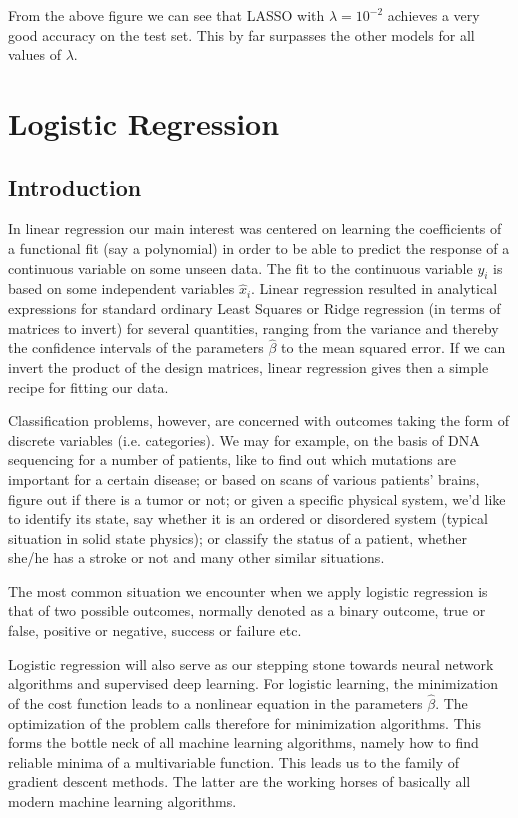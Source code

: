 \documentclass[letterpaper,10pt,english]{sphinxmanual}
\begin{document}
From the above figure we can see that LASSO with \(\lambda = 10^{-2}\)
achieves a very good accuracy on the test set. This by far surpasses the
other models for all values of \(\lambda\).


\section{Logistic Regression}
\label{\detokenize{chapter5:logistic-regression}}\label{\detokenize{chapter5::doc}}

\subsection{Introduction}
\label{\detokenize{chapter5:introduction}}
In linear regression our main interest was centered on learning the
coefficients of a functional fit (say a polynomial) in order to be
able to predict the response of a continuous variable on some unseen
data. The fit to the continuous variable \(y_i\) is based on some
independent variables \(\hat{x}_i\). Linear regression resulted in
analytical expressions for standard ordinary Least Squares or Ridge
regression (in terms of matrices to invert) for several quantities,
ranging from the variance and thereby the confidence intervals of the
parameters \(\hat{\beta}\) to the mean squared error. If we can invert
the product of the design matrices, linear regression gives then a
simple recipe for fitting our data.

Classification problems, however, are concerned with outcomes taking
the form of discrete variables (i.e. categories). We may for example,
on the basis of DNA sequencing for a number of patients, like to find
out which mutations are important for a certain disease; or based on
scans of various patients’ brains, figure out if there is a tumor or
not; or given a specific physical system, we’d like to identify its
state, say whether it is an ordered or disordered system (typical
situation in solid state physics); or classify the status of a
patient, whether she/he has a stroke or not and many other similar
situations.

The most common situation we encounter when we apply logistic
regression is that of two possible outcomes, normally denoted as a
binary outcome, true or false, positive or negative, success or
failure etc.

Logistic regression will also serve as our stepping stone towards
neural network algorithms and supervised deep learning. For logistic
learning, the minimization of the cost function leads to a non\sphinxhyphen{}linear
equation in the parameters \(\hat{\beta}\). The optimization of the
problem calls therefore for minimization algorithms. This forms the
bottle neck of all machine learning algorithms, namely how to find
reliable minima of a multi\sphinxhyphen{}variable function. This leads us to the
family of gradient descent methods. The latter are the working horses
of basically all modern machine learning algorithms.
\end{document}
